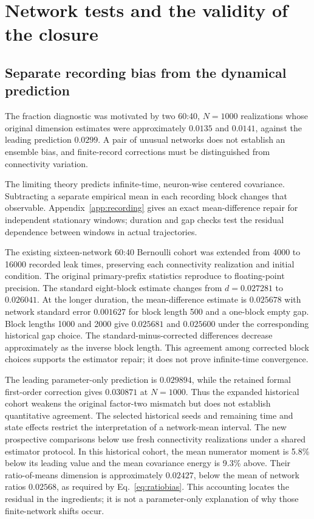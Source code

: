 \section{Network tests and the validity of the closure}
\label{sec:results}

\subsection{Separate recording bias from the dynamical prediction}

The fraction diagnostic was motivated by two 60:40, $N=1000$ realizations
whose original dimension estimates were approximately $0.0135$ and $0.0141$,
against the leading prediction $0.0299$. A pair of unusual networks does
not establish an ensemble bias, and finite-record corrections must be
distinguished from connectivity variation.

The limiting theory predicts infinite-time, neuron-wise centered covariance.
Subtracting a separate empirical mean in each recording block changes that
observable. Appendix~\ref{app:recording} gives an exact mean-difference repair
for independent stationary windows; duration and gap checks test the residual
dependence between windows in actual trajectories.

The existing sixteen-network 60:40 Bernoulli cohort was extended from 4000
to 16000 recorded leak times, preserving each connectivity realization and
initial condition. The original primary-prefix statistics reproduce to
floating-point precision. The standard eight-block estimate changes from
$d=0.027281$ to $0.026041$. At the longer duration, the mean-difference
estimate is $0.025678$ with network standard error $0.001627$ for block
length 500 and a one-block empty gap. Block lengths 1000 and 2000 give
$0.025681$ and $0.025600$ under the corresponding historical gap choice.
The standard-minus-corrected differences decrease approximately as the
inverse block length. This agreement among corrected block choices supports
the estimator repair; it does not prove infinite-time convergence.

The leading parameter-only prediction is $0.029894$, while the retained
formal first-order correction gives $0.030871$ at $N=1000$. Thus the
expanded historical cohort weakens the original factor-two mismatch but
does not establish quantitative agreement. The selected historical seeds
and remaining time and state effects restrict the interpretation of a
network-mean interval. The new prospective comparisons below use fresh
connectivity realizations under a shared estimator protocol.
In this historical cohort, the mean numerator moment is 5.8\% below its
leading value and the mean covariance energy is 9.3\% above. Their
ratio-of-means dimension is approximately $0.02427$, below the mean of
network ratios $0.02568$, as required by Eq.~\eqref{eq:ratiobias}.
This accounting locates the residual in the ingredients; it is not a
parameter-only explanation of why those finite-network shifts occur.

